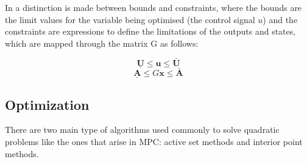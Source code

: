 In \cite{Ferreau2006} a distinction is made between bounds and constraints, where the bounds are the limit values for the variable being optimised (the control signal $u$) and the constraints are expressions to define the limitations of the outputs and states, which are mapped through the matrix G as follows:

\begin{equation} \label{constraints1}
\underline{\mathbf{U}} \leq \mathbf{u} \leq \bar{\mathbf{U}}
\end{equation}
\begin{equation} \label{constraints2}
\underline{\mathbf{A}} \leq G\mathbf{x} \leq \bar{\mathbf{A}} 
\end{equation}


\subsection{Optimization}%

There are two main type of algorithms used commonly to solve quadratic problems like the ones that arise in MPC: active set methods and interior point methods.

